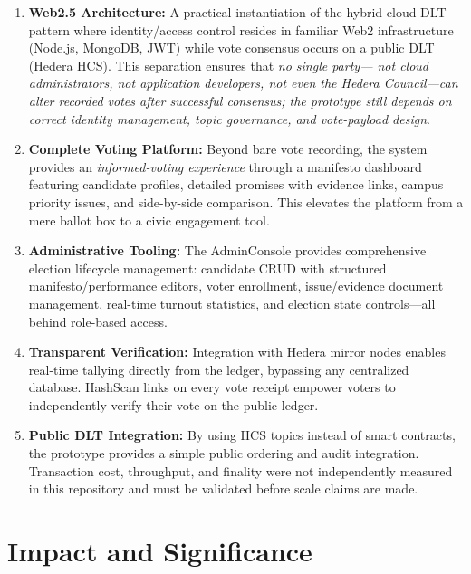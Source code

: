 \begin{enumerate}
    \item \textbf{Web2.5 Architecture:} A practical instantiation of the hybrid
    cloud-DLT pattern where identity/access control resides in familiar Web2
    infrastructure (Node.js, MongoDB, JWT) while vote consensus occurs on a
    public DLT (Hedera HCS). This separation ensures that \textit{no single party---
    not cloud administrators, not application developers, not even the Hedera
    Council---can alter recorded votes after successful consensus; the prototype
    still depends on correct identity management, topic governance, and vote-payload
    design}.

    \item \textbf{Complete Voting Platform:} Beyond bare vote recording, the system
    provides an \textit{informed-voting experience} through a manifesto dashboard
    featuring candidate profiles, detailed promises with evidence links, campus
    priority issues, and side-by-side comparison. This elevates the platform from
    a mere ballot box to a civic engagement tool.

    \item \textbf{Administrative Tooling:} The AdminConsole provides comprehensive
    election lifecycle management: candidate CRUD with structured manifesto/performance
    editors, voter enrollment, issue/evidence document management, real-time
    turnout statistics, and election state controls---all behind role-based access.

    \item \textbf{Transparent Verification:} Integration with Hedera mirror nodes
    enables real-time tallying directly from the ledger, bypassing any centralized
    database. HashScan links on every vote receipt empower voters to independently
    verify their vote on the public ledger.

    \item \textbf{Public DLT Integration:} By using HCS topics instead of smart
    contracts, the prototype provides a simple public ordering and audit
    integration. Transaction cost, throughput, and finality were not independently
    measured in this repository and must be validated before scale claims are made.
\end{enumerate}

\section{Impact and Significance}
\label{sec:impact}

